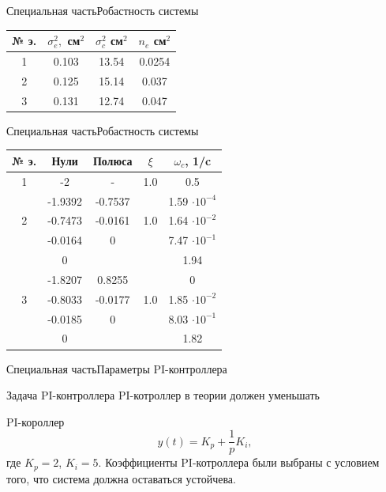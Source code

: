 \begin{frame}{Специальная часть}{Робастность системы}

\begin{table}[H]
    \begin{tabular}{|c|c|c|c|}
        \hline 
        № э.& $\sigma^2_e,$ см$^2$ & $\sigma^2_c$ см$^2$ & $n_e$ см$^2$ \\ \hline 
        1& 0.103 & 13.54 & 0.0254\\ \hline
        2& 0.125 & 15.14  & 0.037 \\ \hline
        3& 0.131 & 12.74 & 0.047\\ \hline

    \end{tabular}
\end{table}
\end{frame}
 
\begin{frame}{Специальная часть}{Робастность системы}
\begin{table}[H]
    \begin{tabular}{|c|c|c|c|c|}
        \hline 
        № э.&Нули & Полюса & $\xi$ & $\omega_c$, 1/c \\ \hline 
        1& -2 & - & 1.0 &0.5 \\ \hline
        & -1.9392 & -0.7537  &  & 1.59 $\cdot 10^{-4}$\\ 
        2& -0.7473 & -0.0161  &1.0 & 1.64 $\cdot 10^{-2}$\\ 
        & -0.0164 &  0 & &7.47 $\cdot 10^{-1}$\\ 
        & 0 &   &  &1.94 \\ \hline 
        & -1.8207 & 0.8255 & &0\\ 
        3& -0.8033 & -0.0177 & 1.0&1.85 $\cdot 10^{-2}$\\ 
        & -0.0185 & 0 & &8.03 $\cdot 10^{-1}$ \\ 
        & 0 &  &  &1.82 \\ \hline
    \end{tabular}
\end{table}

\end{frame}

\begin{frame}{Специальная часть}{Параметры PI-контроллера}
    \begin{block}{Задача PI-контроллера}
        PI-котроллер в теории должен уменьшать  
    \end{block}
    \begin{block}{PI-короллер}
        $$y(t) = K_p + \frac{1}{p}K_i,$$
        где $K_p = 2$, $K_i = 5$.
        Коэффициенты PI-котроллера были выбраны с условием того, что система должна оставаться устойчева.     
    \end{block}
\end{frame}

